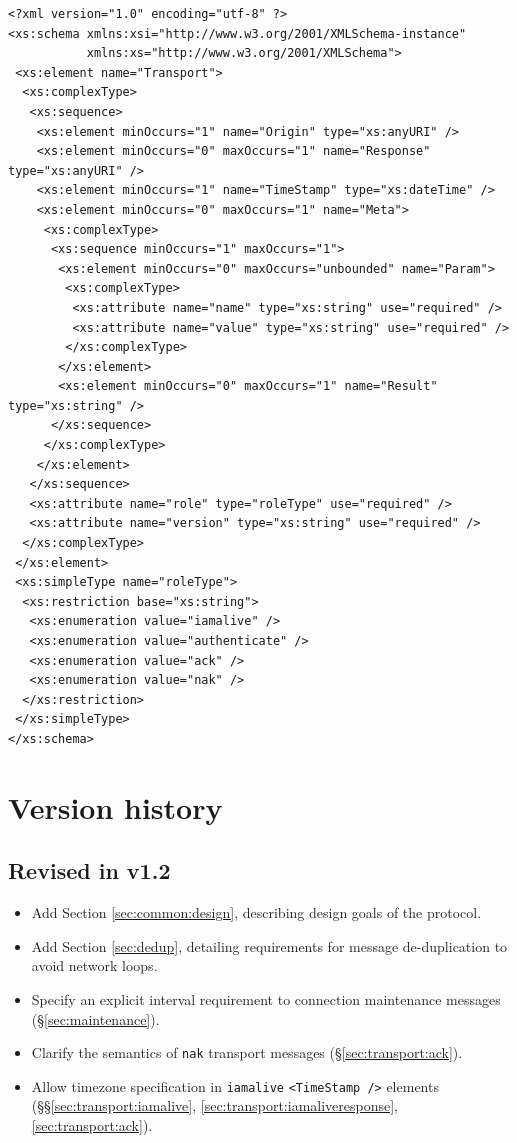 \documentclass[a4paper,11pt]{ivoa}
\begin{document}
\begin{verbatim}
<?xml version="1.0" encoding="utf-8" ?>
<xs:schema xmlns:xsi="http://www.w3.org/2001/XMLSchema-instance"
           xmlns:xs="http://www.w3.org/2001/XMLSchema">
 <xs:element name="Transport">
  <xs:complexType>
   <xs:sequence>
    <xs:element minOccurs="1" name="Origin" type="xs:anyURI" />
    <xs:element minOccurs="0" maxOccurs="1" name="Response" type="xs:anyURI" />
    <xs:element minOccurs="1" name="TimeStamp" type="xs:dateTime" />
    <xs:element minOccurs="0" maxOccurs="1" name="Meta">
     <xs:complexType>
      <xs:sequence minOccurs="1" maxOccurs="1">
       <xs:element minOccurs="0" maxOccurs="unbounded" name="Param">
        <xs:complexType>
         <xs:attribute name="name" type="xs:string" use="required" />
         <xs:attribute name="value" type="xs:string" use="required" />
        </xs:complexType>
       </xs:element>
       <xs:element minOccurs="0" maxOccurs="1" name="Result" type="xs:string" />
      </xs:sequence>
     </xs:complexType>
    </xs:element>
   </xs:sequence>
   <xs:attribute name="role" type="roleType" use="required" />
   <xs:attribute name="version" type="xs:string" use="required" />
  </xs:complexType>
 </xs:element>
 <xs:simpleType name="roleType">
  <xs:restriction base="xs:string">
   <xs:enumeration value="iamalive" />
   <xs:enumeration value="authenticate" />
   <xs:enumeration value="ack" />
   <xs:enumeration value="nak" />
  </xs:restriction>
 </xs:simpleType>
</xs:schema>
\end{verbatim}

\section{Version history}

\subsection{Revised in v1.2}

\begin{itemize}
    \item{Add Section \ref{sec:common:design}, describing design goals of the
    protocol.}

    \item{Add Section \ref{sec:dedup}, detailing requirements for message
    de-duplication to avoid network loops.}

    \item{Specify an explicit interval requirement to connection maintenance
    messages (\S\ref{sec:maintenance}).}

    \item{Clarify the semantics of \texttt{nak} transport messages
    (\S\ref{sec:transport:ack}).}

    \item{Allow timezone specification in \texttt{iamalive}
    \texttt{<TimeStamp~/>} elements (\S\S\ref{sec:transport:iamalive},
    \ref{sec:transport:iamaliveresponse}, \ref{sec:transport:ack}).}

\end{itemize}
\end{document}
